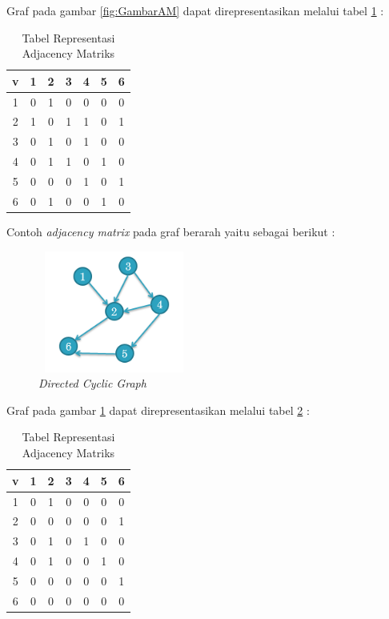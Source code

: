 Graf pada gambar \ref{fig:GambarAM} dapat direpresentasikan melalui tabel \ref{tabelAM} :


\begin{table}[H]
\centering
\caption{Tabel Representasi Adjacency Matriks}
\begin{tabular}{|c|c|c|c|c|c|c|}
\hline
v & 1 & 2 & 3 & 4 & 5 & 6 \\
\hline
1 & 0 & 1 & 0 & 0 & 0 & 0 \\
\hline
2 & 1 & 0 & 1 & 1 & 0 & 1 \\
\hline
3 & 0 & 1 & 0 & 1 & 0 & 0 \\
\hline
4 & 0 & 1 & 1 & 0 & 1 & 0 \\
\hline
5 & 0 & 0 & 0 & 1 & 0 & 1 \\
\hline
6 & 0 & 1 & 0 & 0 & 1 & 0 \\
\hline
\end{tabular}
\label{tabelAM}
\end{table}

Contoh \textit{adjacency matrix} pada graf berarah yaitu sebagai berikut :

\begin{figure} [H]
		\centering  
		\includegraphics[width=5cm, height=4cm]{graf3} 
		\caption[\textit{Directed Cyclic Graph}]{\textit{Directed Cyclic Graph}}
		\label{fig:GambarDCG} 
	\end{figure}
	
Graf pada gambar \ref{fig:GambarDCG} dapat direpresentasikan melalui tabel \ref{tabelDCG} :

\begin{table}[H]
\centering
\caption{Tabel Representasi Adjacency Matriks}
\begin{tabular}{|c|c|c|c|c|c|c|}
\hline
v & 1 & 2 & 3 & 4 & 5 & 6 \\
\hline
1 & 0 & 1 & 0 & 0 & 0 & 0 \\
\hline
2 & 0 & 0 & 0 & 0 & 0 & 1 \\
\hline
3 & 0 & 1 & 0 & 1 & 0 & 0 \\
\hline
4 & 0 & 1 & 0 & 0 & 1 & 0 \\
\hline
5 & 0 & 0 & 0 & 0 & 0 & 1 \\
\hline
6 & 0 & 0 & 0 & 0 & 0 & 0 \\
\hline
\end{tabular}
\label{tabelDCG}
\end{table}


